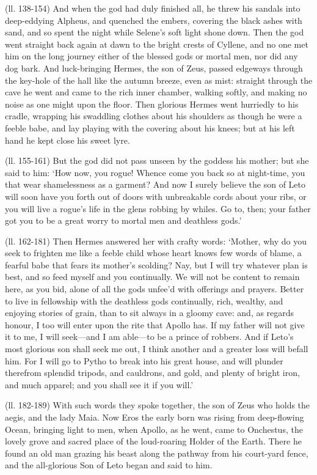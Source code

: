 (ll. 138-154) And when the god had duly finished all, he threw his sandals into
deep-eddying Alpheus, and quenched the embers, covering the black ashes with
sand, and so spent the night while Selene’s soft light shone down. Then
the god went straight back again at dawn to the bright crests of Cyllene, and
no one met him on the long journey either of the blessed gods or mortal men,
nor did any dog bark. And luck-bringing Hermes, the son of Zeus, passed
edgeways through the key-hole of the hall like the autumn breeze, even as mist:
straight through the cave he went and came to the rich inner chamber, walking
softly, and making no noise as one might upon the floor. Then glorious Hermes
went hurriedly to his cradle, wrapping his swaddling clothes about his
shoulders as though he were a feeble babe, and lay playing with the covering
about his knees; but at his left hand he kept close his sweet lyre.

(ll. 155-161) But the god did not pass unseen by the goddess his mother; but
she said to him: ‘How now, you rogue! Whence come you back so at
night-time, you that wear shamelessness as a garment? And now I surely believe
the son of Leto will soon have you forth out of doors with unbreakable cords
about your ribs, or you will live a rogue’s life in the glens robbing by
whiles. Go to, then; your father got you to be a great worry to mortal men and
deathless gods.’

(ll. 162-181) Then Hermes answered her with crafty words: ‘Mother, why do
you seek to frighten me like a feeble child whose heart knows few words of
blame, a fearful babe that fears its mother’s scolding? Nay, but I will
try whatever plan is best, and so feed myself and you continually. We will not
be content to remain here, as you bid, alone of all the gods unfee’d with
offerings and prayers. Better to live in fellowship with the deathless gods
continually, rich, wealthy, and enjoying stories of grain, than to sit always
in a gloomy cave: and, as regards honour, I too will enter upon the rite that
Apollo has. If my father will not give it to me, I will seek—and I am
able—to be a prince of robbers. And if Leto’s most glorious son
shall seek me out, I think another and a greater loss will befall him. For I
will go to Pytho to break into his great house, and will plunder therefrom
splendid tripods, and cauldrons, and gold, and plenty of bright iron, and much
apparel; and you shall see it if you will.’

(ll. 182-189) With such words they spoke together, the son of Zeus who holds
the aegis, and the lady Maia. Now Eros the early born was rising from
deep-flowing Ocean, bringing light to men, when Apollo, as he went, came to
Onchestus, the lovely grove and sacred place of the loud-roaring Holder of the
Earth. There he found an old man grazing his beast along the pathway from his
court-yard fence, and the all-glorious Son of Leto began and said to him.

